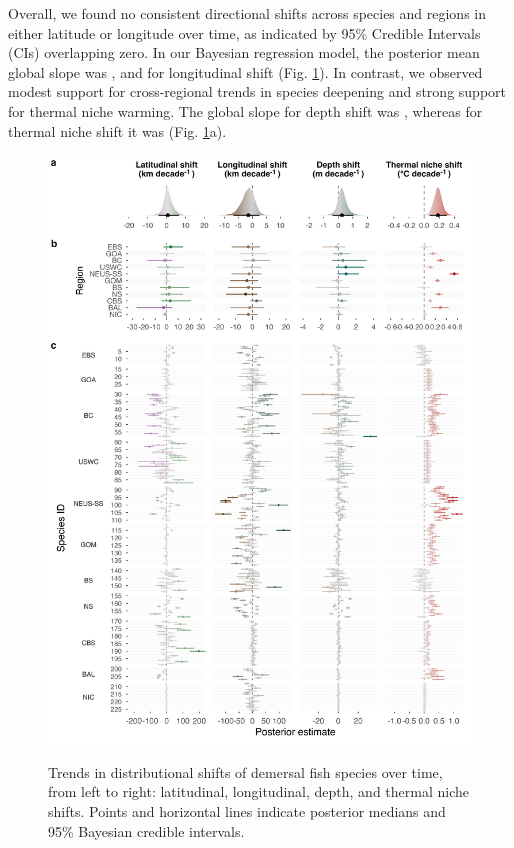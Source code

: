 \documentclass[lineno,pdflatex,sn-nature]{sn-jnl}%
\begin{document}
Overall, we found no consistent directional shifts across species and regions in either latitude or longitude over time, as indicated by 95\% Credible Intervals (CIs) overlapping zero. In our Bayesian regression model, the posterior mean global slope was \cogycValue, and for longitudinal shift \cogxcValue (Fig. \ref{fig:posterior_slopes}). In contrast, we observed modest support for cross-regional trends in species deepening and strong support for thermal niche warming. The global slope for depth shift was \depthnichecValue, whereas for thermal niche shift it was \thermalnichecValue (Fig. \ref{fig:posterior_slopes}a).

\begin{figure}[h]
\centering
\includegraphics[width=1\textwidth]{output/figures/main/posterior_slopes.png}
\label{fig:posterior_slopes}
\caption{Trends in distributional shifts of demersal fish species over time, from left to right: latitudinal, longitudinal, depth, and thermal niche shifts. Points and horizontal lines indicate posterior medians and 95\% Bayesian credible intervals.  
}
\end{figure}
\end{document}

